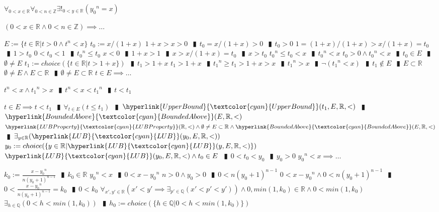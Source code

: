 \documentclass{book}
\newcommand{\wff}[1]{\hypertarget{#1}{\fbox{\textcolor{red}{$#1$}}\phantom{--}}}
\newcommand{\rf}[1]{\hyperlink{#1}{\textcolor{cyan}{#1}}}
\newcommand{\abr}{:=}
\newcommand{\pipe}{$\phantom{(}\vrectangleblack\phantom{)}$}
\newcommand{\pr}[1]{\left(#1\right)}
\begin{document}
\wff{RootExistenceInR} $\forall_{0 < x \in \mathbb{R}} \forall_{0 < n \in \mathbb{Z}} \exists!_{0 < y \in \mathbb{R}}({y_0}^n = x)$
\begin{enumerate}
  \lit $(0 < x \in \mathbb{R} \land 0 < n \in \mathbb{Z}) \implies \ldots$
  \begin{enumerate}
    \lit $E \abr \{t \in \mathbb{R} | t > 0 \land t^n < x\}$ 
    \lit $t_0 \abr x / (1 + x)$
    \lit $1 + x > x > 0$ \pipe $t_0 = x / (1 + x) > 0$ \pipe $t_0 > 0$
    \lit $1 = (1 + x) / (1 + x) > x / (1 + x) = t_0$ \pipe $1 > t_0$
    \lit $0 < t_0 < 1$ \pipe ${t_0}^n \leq t_0$
    \lit $x < 0$ \pipe $1 + x > 1$ \pipe $x > x / (1 + x) = t_0$ \pipe $x > t_0$
    \lit ${t_0}^n \leq t_0 < x$ \pipe ${t_0}^n < x$
    \lit $t_0 > 0 \land {t_0}^n < x$ \pipe $t_0 \in E$ \pipe $\emptyset \neq E$
    \lit $t_1 \abr choice(\{t \in \mathbb{R} | t > 1 + x\})$ \pipe $t_1 > 1 + x$
    \lit $t_1 > 1 + x$ \pipe ${t_1}^n \geq t_1 > 1 + x > x$ \pipe ${t_1}^n > x$ \pipe $\lnot({t_1}^n < x)$ \pipe $t_1 \notin E$ \pipe $E \subset \mathbb{R}$
    \lit $\emptyset \neq E \land E \subset \mathbb{R}$ \pipe $\emptyset \neq E \subset \mathbb{R}$
    \lit $t \in E \implies \ldots$
    \begin{enumerate}
      \lit $t^n < x \land {t_1}^n > x$ \pipe $t^n < x < {t_1}^n$ \pipe $t < t_1$
    \end{enumerate}
    \lit $t \in E \implies t < t_1$ \pipe $\forall_{t \in E}(t \leq t_1)$ \pipe $\rf{UpperBound}(t_1, E, \mathbb{R}, <)$ \pipe $\rf{BoundedAbove}(E, \mathbb{R}, <)$
    \lit $\rf{LUBProperty}(\mathbb{R}, <) \land \emptyset \neq E \subset \mathbb{R} \land \rf{BoundedAbove}(E, \mathbb{R}, <)$ \pipe $\exists_{y \in \mathbb{R}}(\rf{LUB}(y_0, E, \mathbb{R}, <))$
    \lit $y_0 \abr choice(\{y \in \mathbb{R} | \rf{LUB}(y, E, \mathbb{R}, <)\})$
    \lit $\rf{LUB}(y_0, E, \mathbb{R}, <) \land t_0 \in E$ \pipe $0 < t_0 < y_0$ \pipe $y_0 > 0$
    \lit ${y_0}^n < x \implies \ldots$
    \begin{enumerate}
      \lit $k_0 \abr \frac{x - {y_0}^n}{n (y_0 + 1)^{n - 1}}$ \pipe $k_0 \in \mathbb{R}$
      \lit ${y_0}^n < x$ \pipe $0 < x - {y_0}^n$
      \lit $n > 0 \land y_0 > 0$ \pipe $0 < n (y_0 + 1)^{n - 1}$
      \lit $0 < x - {y_0}^n \land 0 < n (y_0 + 1)^{n - 1}$ \pipe $0 < \frac{x - {y_0}^n}{n (y_0 + 1)^{n - 1}} = k_0$ \pipe $0 < k_0$
      \lit $\forall_{x', y' \in \mathbb{R}}\pr{x' < y' \implies \exists_{p' \in \mathbb{Q}}(x' < p' < y')} \land 0, min(1, k_0) \in \mathbb{R} \land 0 < min(1, k_0)$
      \lit $\exists_{h \in \mathbb{Q}}(0 < h < min(1, k_0))$ \pipe $h_0 \abr choice(\{h \in \mathbb{Q} | 0 < h < min(1, k_0)\})$

\end{enumerate}
\end{enumerate}
\end{enumerate}
\end{document}
